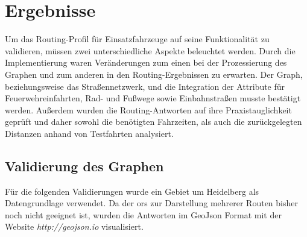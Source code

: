 \section{Ergebnisse}

Um das Routing-Profil für Einsatzfahrzeuge auf seine Funktionalität zu validieren, müssen zwei unterschiedliche Aspekte beleuchtet werden.
Durch die Implementierung waren Veränderungen zum einen bei der Prozessierung des Graphen und zum anderen in den Routing-Ergebnissen zu erwarten.
Der Graph, beziehungsweise das Straßennetzwerk, und die Integration der Attribute für Feuerwehreinfahrten, Rad- und Fußwege sowie Einbahnstraßen musste bestätigt werden.
Außerdem wurden die Routing-Antworten auf ihre Praxistauglichkeit geprüft und daher sowohl die benötigten Fahrzeiten, als auch die zurückgelegten Distanzen anhand von Testfahrten analysiert.


\subsection{Validierung des Graphen}

Für die folgenden Validierungen wurde ein Gebiet um Heidelberg als Datengrundlage verwendet.
Da der \gls{ors} zur Darstellung mehrerer Routen bisher noch nicht geeignet ist, wurden die Antworten im GeoJson Format mit der Website \textit{http://geojson.io} visualisiert.

